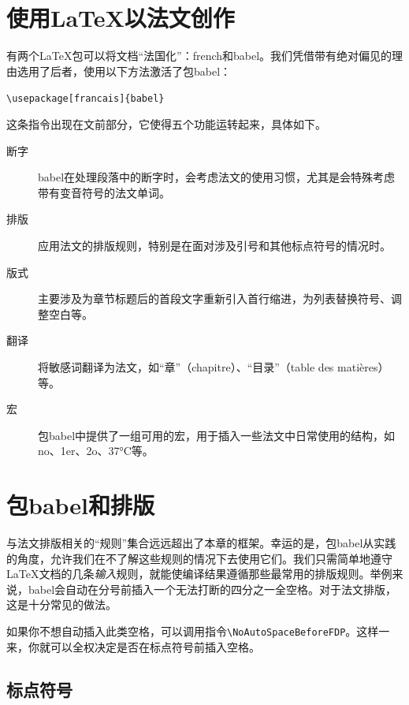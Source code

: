 \section{使用\LaTeX 以法文创作}

有两个\LaTeX 包可以将文档“法国化”：\textsf{french}和\textsf{babel}。我们凭借带有绝对偏见的理由选用了后者，使用以下方法激活了包\textsf{babel}：

\begin{dmd}
\verb|\usepackage[francais]{babel}|
\end{dmd}

这条指令出现在文前部分，它使得五个功能运转起来，具体如下。

\begin{description}
    \item[断字] \textsf{babel}在处理段落中的断字时，会考虑法文的使用习惯，尤其是会特殊考虑带有变音符号的法文单词。
    \item[排版] 应用法文的排版规则，特别是在面对涉及引号和其他标点符号的情况时。
    \item[版式] 主要涉及为章节标题后的首段文字重新引入首行缩进，为列表替换符号、调整空白等。
    \item[翻译] 将敏感词翻译为法文，如“章”（chapitre）、“目录”（table des matières）等。
    \item[宏] 包\textsf{babel}中提供了一组可用的宏，用于插入一些法文中日常使用的结构，如no、1er、2o、37°C等。
\end{description}

\section{包\textsf{babel}和排版}

与法文排版相关的“规则”集合远远超出了本章的框架。幸运的是，包\textsf{babel}从实践的角度，允许我们在不了解这些规则的情况下去使用它们。我们只需简单地遵守\LaTeX 文档的几条\emph{输入}规则，就能使编译结果遵循那些最常用的排版规则。举例来说，\textsf{babel}会自动在分号前插入一个无法打断的四分之一全空格。对于法文排版，这是十分常见的做法。

\begin{ii}
如果你不想自动插入此类空格，可以调用指令\verb|\NoAutoSpaceBeforeFDP|。这样一来，你就可以全权决定是否在标点符号前插入空格。
\end{ii}

\subsection{标点符号}

